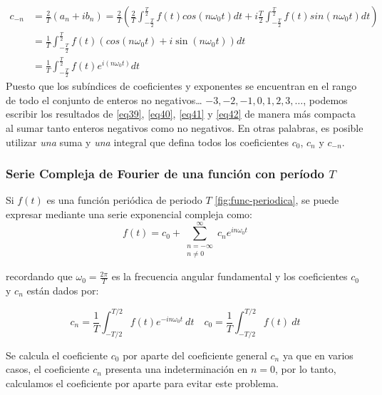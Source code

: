 \begin{equation} \label{eq42}
	\begin{split}
		c_{-n} &= \frac{2}{T} \left(a_n + i b_n\right) = \frac{2}{T} \left(\frac{2}{T} \int_{-\frac{T}{2}}^{\frac{T}{2}} f(t) cos(n\omega_0 t)  dt + i \frac{T}{2} \int_{-\frac{T}{2}}^{\frac{T}{2}} f(t) sin(n\omega_0 t) dt\right) \\
		&=  \frac{1}{T} \int_{-\frac{T}{2}}^{\frac{T}{2}} f(t) \left( cos(n\omega_0 t)  + i \sin (n\omega_0 t)  \right) dt \\
		&= \frac{1}{T} \int_{-\frac{T}{2}}^{\frac{T}{2}} f(t) e^{i (n\omega_0 t)}  dt		
	\end{split}
\end{equation}
Puesto que los subíndices de coeficientes y exponentes se encuentran en el rango de todo el conjunto de enteros no negativos… $-3, -2, -1, 0, 1, 2, 3, \dots$, podemos escribir los resultados de \eqref{eq39}, \eqref{eq40}, \eqref{eq41} y \eqref{eq42} de manera más compacta al sumar tanto enteros negativos como no negativos. En otras palabras, es posible utilizar \textit{una} suma y \textit{una} integral que defina todos los coeficientes $c_0$, $c_n$ y $c_{-n}$. ~\cite{matesAvanzadasZill}


\subsubsection{Serie Compleja de Fourier de una función con período $T$}
Si $f(t)$ es una función periódica de periodo $T$ \ref{fig:func-periodica}, se puede expresar mediante una serie exponencial compleja como: ~\cite{fourierHsu}
\begin{equation}\label{eq45}
	f(t) = c_0 + \sum_{\substack{n=-\infty \\ n \neq 0}}^{\infty} c_n e^{i n \omega_0 t}
\end{equation}


recordando que $\omega_0 = \frac{2\pi}{T}$ es la frecuencia angular fundamental y los coeficientes $c_0$ y $c_n$ están dados por: 

\begin{equation}\label{eq43}
	c_n = \frac{1}{T} \int_{-T/2}^{T/2} f(t) e^{-i n \omega_0 t} \ dt \quad c_0 = \frac{1}{T} \int_{-T/2}^{T/2} f(t)\ dt 
\end{equation}

Se calcula el coeficiente $c_0$ por aparte del coeficiente general $c_n$ ya que en varios casos, el coeficiente $c_n$ presenta una indeterminación en $n=0$, por lo tanto, calculamos el coeficiente por aparte para evitar este problema.\newline

